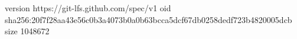 version https://git-lfs.github.com/spec/v1
oid sha256:20f7f28aa43e56c0b3a4073b0a0b63bcca5dcf67db0258dedf723b4820005dcb
size 1048672
